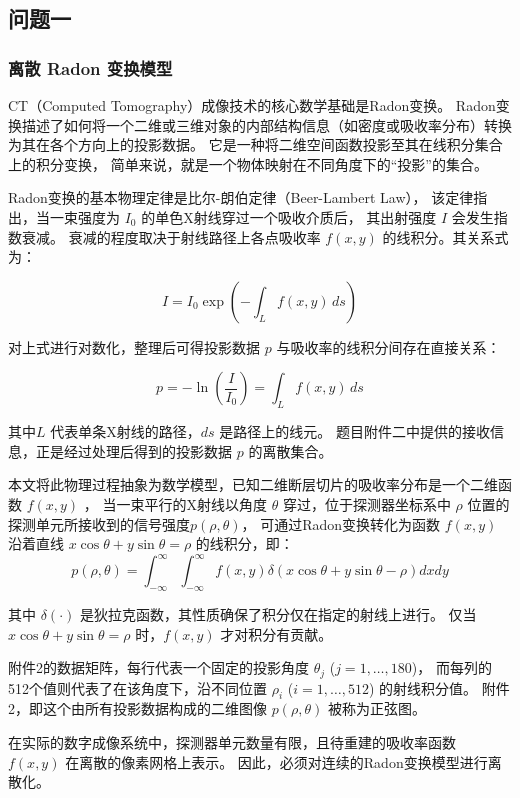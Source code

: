 \subsection{问题一}

\subsubsection{离散 Radon 变换模型}

CT（Computed Tomography）成像技术的核心数学基础是Radon变换。
Radon变换描述了如何将一个二维或三维对象的内部结构信息（如密度或吸收率分布）转换为其在各个方向上的投影数据。
它是一种将二维空间函数投影至其在线积分集合上的积分变换，
简单来说，就是一个物体映射在不同角度下的“投影”的集合。\par


Radon变换的基本物理定律是比尔-朗伯定律（Beer-Lambert Law），
该定律指出，当一束强度为 $I_0$ 的单色X射线穿过一个吸收介质后，
其出射强度 $I$ 会发生指数衰减。
衰减的程度取决于射线路径上各点吸收率 $f(x,y)$ 的线积分。其关系式为：

$$
I = I_0 \exp \left( - \int_L f(x,y) \, ds \right)
$$

对上式进行对数化，整理后可得投影数据 $p$ 与吸收率的线积分间存在直接关系：

$$
p = -\ln\left(\frac{I}{I_0}\right) = \int_L f(x,y) \, ds
$$

其中$L$ 代表单条X射线的路径，$ds$ 是路径上的线元。
题目附件二中提供的接收信息，正是经过处理后得到的投影数据 $p$ 的离散集合。

本文将此物理过程抽象为数学模型，已知二维断层切片的吸收率分布是一个二维函数 $f(x,y)$ ，
当一束平行的X射线以角度 $\theta$ 穿过，位于探测器坐标系中 $\rho$ 位置的探测单元所接收到的信号强度$p(\rho,\theta)$，
可通过Radon变换转化为函数 $f(x,y)$ 沿着直线 $x\cos\theta+y\sin\theta=\rho$ 的线积分，即：
$$p(\rho,\theta)=\int_{-\infty}^{\infty}\int_{-\infty}^{\infty}f(x,y)\delta(x\cos\theta+y\sin\theta-\rho)dxdy$$

其中 $\delta(\cdot)$ 是狄拉克函数，其性质确保了积分仅在指定的射线上进行。
仅当 $x\cos\theta+y\sin\theta=\rho$ 时，$f(x,y)$ 才对积分有贡献。\par

附件2的数据矩阵，每行代表一个固定的投影角度 $\theta_j$ ($j=1, \dots, 180$)，
而每列的512个值则代表了在该角度下，沿不同位置 $\rho_i$ ($i=1, \dots, 512$) 的射线积分值。
附件2，即这个由所有投影数据构成的二维图像 $p(\rho,\theta)$ 被称为正弦图。\par

在实际的数字成像系统中，探测器单元数量有限，且待重建的吸收率函数 $f(x,y)$ 在离散的像素网格上表示。
因此，必须对连续的Radon变换模型进行离散化。

